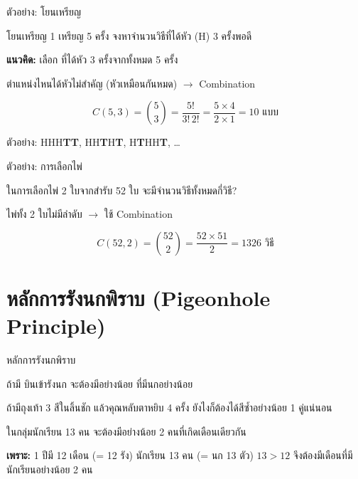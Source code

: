\documentclass[11pt, aspectratio=169]{beamer}
\begin{document}
\begin{frame}{ตัวอย่าง: โยนเหรียญ}
  \begin{exambox}
    โยนเหรียญ 1 เหรียญ 5 ครั้ง จงหาจำนวนวิธีที่ได้หัว (H) 3 ครั้งพอดี
  \end{exambox}

  \begin{solbox}[วิธีทำ]
    \textbf{แนวคิด:} เลือก  ที่ได้หัว 3 ครั้งจากทั้งหมด 5 ครั้ง

    \medskip
    ตำแหน่งไหนได้หัวไม่สำคัญ (หัวเหมือนกันหมด) $\rightarrow$ Combination

    \[
      C(5, 3) = \binom{5}{3} = \frac{5!}{3! \, 2!}
      = \frac{5 \times 4}{2 \times 1} = 10 \text{ แบบ}
    \]

    \medskip
    ตัวอย่าง: HHH\textbf{TT}, HH\textbf{T}H\textbf{T}, H\textbf{T}HH\textbf{T}, \ldots
  \end{solbox}
\end{frame}

\begin{frame}{ตัวอย่าง: การเลือกไพ่}
  \begin{exambox}
    ในการเลือกไพ่ 2 ใบจากสำรับ 52 ใบ จะมีจำนวนวิธีทั้งหมดกี่วิธี?
  \end{exambox}

  \begin{solbox}[วิธีทำ]
    ไพ่ทั้ง 2 ใบไม่มีลำดับ $\rightarrow$ ใช้ Combination

    \[
      C(52, 2) = \binom{52}{2} = \frac{52 \times 51}{2} = 1326 \text{ วิธี}
    \]
  \end{solbox}
\end{frame}

\section{หลักการรังนกพิราบ (Pigeonhole Principle)}

\begin{frame}{หลักการรังนกพิราบ}
  \begin{explanation}[หลักการ]
    ถ้ามี  บินเข้ารังนก 
    จะต้องมีอย่างน้อย  ที่มีนกอย่างน้อย 
  \end{explanation}

  \begin{intuition}[คิดแบบบ้าน ๆ]
    ถ้ามีถุงเท้า 3 สีในลิ้นชัก แล้วคุณหลับตาหยิบ 4 ครั้ง
    ยังไงก็ต้องได้สีซํ้าอย่างน้อย 1 คู่แน่นอน
  \end{intuition}

  \begin{exambox}
    ในกลุ่มนักเรียน 13 คน
    จะต้องมีอย่างน้อย 2 คนที่เกิดเดือนเดียวกัน

    \textbf{เพราะ:} 1 ปีมี 12 เดือน (= 12 รัง) นักเรียน 13 คน (= นก 13 ตัว)
    $13 > 12$ จึงต้องมีเดือนที่มีนักเรียนอย่างน้อย 2 คน
  \end{exambox}
\end{frame}
\end{document}
